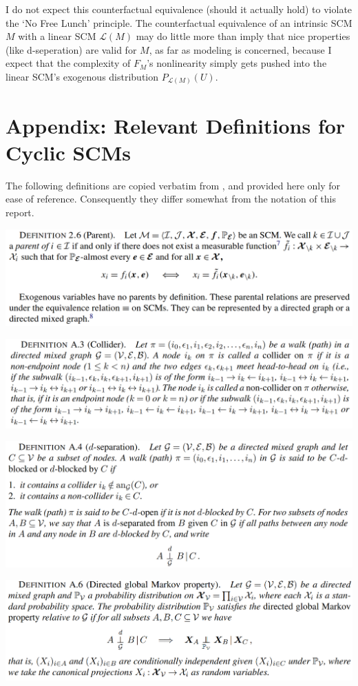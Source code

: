 \documentclass[letterpaper,10pt]{article}
\begin{document}
I do not expect this counterfactual equivalence (should it actually hold) to violate the `No Free Lunch' principle.
The counterfactual equivalence of an intrinsic SCM $M$ with a linear SCM $\mathcal{L}(M)$ may do little more than imply that nice properties (like d-seperation) are valid for $M$, as far as modeling is concerned, because I expect that the complexity of $F_M$'s nonlinearity simply gets pushed into the linear SCM's exogenous distribution $P_{\mathcal{L}(M)}(U)$.

\section{Appendix: Relevant Definitions for Cyclic SCMs}\label{foundations-material}
The following definitions are copied verbatim from \cite{Foundations}, and provided here only for ease of reference. Consequently they differ somewhat from the notation of this report.

\centering
\includegraphics[width=.8\linewidth]{pics/cited/parents_Foundations.png}

\centering
\includegraphics[width=.8\linewidth]{pics/cited/collider_Foundations.png}

\centering
\includegraphics[width=.8\linewidth]{pics/cited/d-separation_Foundations.png}

\centering
\includegraphics[width=.8\linewidth]{pics/cited/directed_global_Markov_Foundations.png}
\end{document}
